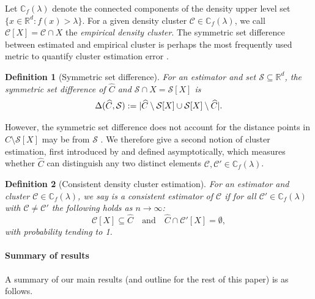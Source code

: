 \documentclass{article}
\DeclarePairedDelimiter\abs{\lvert}{\rvert}
\newcommand{\Reals}{\mathbb{R}}
\newcommand{\Rd}{\Reals^d}
\newcommand{\1}{\mathbf{1}}
\newcommand{\Xbf}{X}             %
\newcommand{\Cbb}{\mathbb{C}}
\newcommand{\Cset}{\mathcal{C}}
\newcommand{\Cest}{\widehat{C}}
\theoremstyle{aldenthm}
\newtheorem{definition}{Definition}
\theoremstyle{aldenrmrk}
\begin{document}
Let $\Cbb_f(\lambda)$ denote the connected components of the density upper level
set $\{x \in \Rd: f(x) > \lambda\}$.  For a given density cluster $\Cset \in
\Cbb_f(\lambda)$, we call $\Cset[\Xbf] = \Cset \cap \Xbf$ the \emph{empirical
density cluster}. The symmetric set difference between estimated and empirical cluster is perhaps the most frequently used metric to quantify cluster estimation error \citep{korostelev2012,polonik1995,rigollet2009}.

\begin{definition}[Symmetric set difference]
	\label{def: symmetric_set_diff}
	For an estimator \smash{$\Cest \subseteq \Xbf$} and set
	$\mathcal{S} \subseteq \Reals^d$, the symmetric set difference of $\Cest$ and $\mathcal{S} \cap \Xbf = \mathcal{S}[\Xbf]$ is 
	\begin{equation}
	\label{eqn: misclassification_rate}
	\Delta(\Cest, \mathcal{S}) := \abs{\Cest \setminus \mathcal{S}[\Xbf] \cup \mathcal{S}[\Xbf] \setminus \Cest}.
	\end{equation}
\end{definition}

However, the symmetric set difference does not account for the distance points in $\widehat{C} \setminus \mathcal{S}[\Xbf]$ may be from $\mathcal{S}$ \citep{singh2009}. We therefore give a second notion of cluster estimation, first introduced by \citet{hartigan1981} and defined asymptotically, which measures whether $\widehat{C}$ can distinguish any two distinct elements $\Cset, \Cset' \in \Cbb_f(\lambda)$. 

\begin{definition}[Consistent density cluster estimation]
	\label{def: consistent_density_cluster_estimation}
	For an estimator \smash{$\Cest \subseteq \Xbf$} and cluster 
	$\Cset \in \Cbb_f(\lambda)$, we say \smash{$\Cest$} is a consistent
	estimator of $\Cset$ if for all $\Cset' \in \Cbb_f(\lambda)$ with $\Cset \not=
	\Cset'$ the following holds as $n \to \infty$: 
	\begin{equation}
	\label{eqn: consistent_density_cluster_recovery}
	\Cset[\Xbf] \subseteq \Cest \quad \text{and} \quad
	\Cest \cap \Cset'[\Xbf] = \emptyset,
	\end{equation}
	with probability tending to 1.
\end{definition}
\paragraph{Summary of results}
A summary of our main results (and outline for the rest of this paper) is as
follows.  
\end{document}
